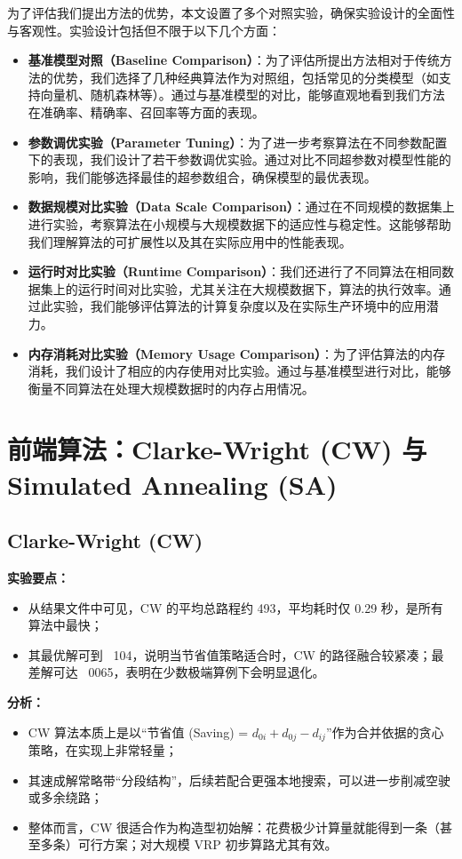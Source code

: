 \documentclass[12pt,a4paper,twoside]{ctexbook}
\begin{document}
为了评估我们提出方法的优势，本文设置了多个对照实验，确保实验设计的全面性与客观性。实验设计包括但不限于以下几个方面：

\begin{itemize}
    \item \textbf{基准模型对照（Baseline Comparison）}：为了评估所提出方法相对于传统方法的优势，我们选择了几种经典算法作为对照组，包括常见的分类模型（如支持向量机、随机森林等）。通过与基准模型的对比，能够直观地看到我们方法在准确率、精确率、召回率等方面的表现。
    \item \textbf{参数调优实验（Parameter Tuning）}：为了进一步考察算法在不同参数配置下的表现，我们设计了若干参数调优实验。通过对比不同超参数对模型性能的影响，我们能够选择最佳的超参数组合，确保模型的最优表现。
    \item \textbf{数据规模对比实验（Data Scale Comparison）}：通过在不同规模的数据集上进行实验，考察算法在小规模与大规模数据下的适应性与稳定性。这能够帮助我们理解算法的可扩展性以及其在实际应用中的性能表现。
    \item \textbf{运行时对比实验（Runtime Comparison）}：我们还进行了不同算法在相同数据集上的运行时间对比实验，尤其关注在大规模数据下，算法的执行效率。通过此实验，我们能够评估算法的计算复杂度以及在实际生产环境中的应用潜力。
    \item \textbf{内存消耗对比实验（Memory Usage Comparison）}：为了评估算法的内存消耗，我们设计了相应的内存使用对比实验。通过与基准模型进行对比，能够衡量不同算法在处理大规模数据时的内存占用情况。
\end{itemize}

\section{前端算法：Clarke-Wright (CW) 与 Simulated Annealing (SA)}

\subsection{Clarke-Wright (CW)}
\textbf{实验要点：}
\begin{itemize}
    \item 从结果文件中可见，CW 的平均总路程约 493，平均耗时仅 0.29 秒，是所有算法中最快；
    \item 其最优解可到 ~104，说明当节省值策略适合时，CW 的路径融合较紧凑；最差解可达 ~0065，表明在少数极端算例下会明显退化。
\end{itemize}

\textbf{分析：}
\begin{itemize}
    \item CW 算法本质上是以“节省值 (Saving) = $d_{0i} + d_{0j} - d_{ij}$”作为合并依据的贪心策略，在实现上非常轻量；
    \item 其速成解常略带“分段结构”，后续若配合更强本地搜索，可以进一步削减空驶或多余绕路；
    \item 整体而言，CW 很适合作为构造型初始解：花费极少计算量就能得到一条（甚至多条）可行方案；对大规模 VRP 初步算路尤其有效。
\end{itemize}
\end{document}
